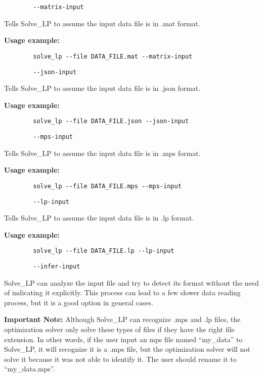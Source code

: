 \documentclass[12pt,hidelinks]{article}
\begin{document}
	{\color{mordantred19}
	\begin{verbatim}
		--matrix-input
	\end{verbatim}
	} Tells Solve\_LP to assume the input data file is in .mat format.

	\textbf{Usage example:} 
	\begin{verbatim}
		solve_lp --file DATA_FILE.mat --matrix-input
	\end{verbatim}

	{\color{mordantred19}
	\begin{verbatim}
		--json-input
	\end{verbatim}
	} Tells Solve\_LP to assume the input data file is in .json format.

	\textbf{Usage example:} 
	\begin{verbatim}
		solve_lp --file DATA_FILE.json --json-input
	\end{verbatim}

	{\color{mordantred19}
	\begin{verbatim}
		--mps-input
	\end{verbatim}
	} Tells Solve\_LP to assume the input data file is in .mps format.

	\textbf{Usage example:} 
	\begin{verbatim}
		solve_lp --file DATA_FILE.mps --mps-input
	\end{verbatim}

	{\color{mordantred19}
	\begin{verbatim}
		--lp-input
	\end{verbatim}
	} Tells Solve\_LP to assume the input data file is in .lp format.

	\textbf{Usage example:} 
	\begin{verbatim}
		solve_lp --file DATA_FILE.lp --lp-input
	\end{verbatim}

	{\color{mordantred19}
	\begin{verbatim}
		--infer-input
	\end{verbatim}
	} Solve\_LP can analyze the input file and try to detect its format without the need of indicating it explicitly. This process can lead to a few slower data reading process, but it is a good option in general cases.

	\textbf{Important Note:} Although Solve\_LP can recognize .mps and .lp files, the optimization solver only solve these types of files if they have the right file extension. In other words, if the user input an mps file named ``my\_data'' to Solve\_LP, it will recognize it is a .mps file, but the optimization solver will not solve it because it was not able to identify it. The user should rename it to ``my\_data.mps''.
\end{document}
